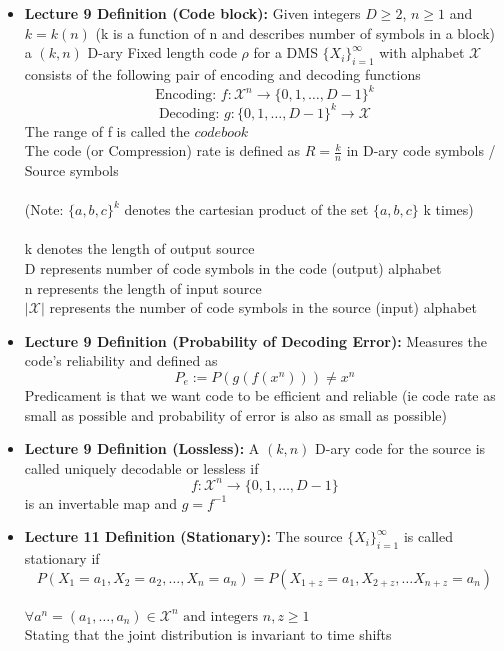 \documentclass{article}
\begin{document}
\begin{itemize}
    \item \textbf{Lecture 9 Definition (Code block):} Given integers \(D \geq 2\), \(n \geq 1\) and \(k = k(n)\) (k is a function of n and describes number of symbols in a block)  a \((k,n)\) D-ary Fixed length code \(\rho\) for a DMS \(\{X_{i}\}^\infty_{i=1}\) with alphabet \(\mathcal{X}\) consists of the following pair of encoding and decoding functions
    \[\text{Encoding: } f: \mathcal{X}^n \to \{0, 1, \ldots, D-1\}^k\] 
    \[\text{Decoding: } g: \{0, 1, \ldots, D-1\}^k \to \mathcal{X}\]
    The range of f is called the \(\mathit{codebook}\)
    \\ The code (or Compression) rate is defined as \(R = \frac{k}{n}\) in D-ary code symbols / Source symbols 
   \\
    \\(Note: \(\{a,b,c\}^k\) denotes the cartesian product of the set \(\{a,b,c\}\) k times)
    \\
   \\ k denotes the length of output source
   \\ D represents number of code symbols in the code (output) alphabet
   \\ n represents the length of input source
   \\ \(|\mathcal{X}|\) represents the number of code symbols in the source (input) alphabet
   
    \item \textbf{Lecture 9 Definition (Probability of Decoding Error): } Measures the code's reliability and defined as
   \[P_e := P(g(f(x^n))) \neq x^n\]
   Predicament is that we want code to be efficient and reliable (ie code rate as small as possible and probability of error is also as small as possible)
   
   \item \textbf{Lecture 9 Definition (Lossless):} A \((k,n)\) D-ary code for the source is called uniquely decodable or lessless if
    \[f: \mathcal{X}^n \to \{0,1,\ldots, D-1\}\]
    is an invertable map and \(g = f^{-1}\)
    \item \textbf{Lecture 11 Definition (Stationary): } The source \(\{X_i\}^\infty_{i=1}\) is called stationary if
    \[P(X_1=a_1, X_2 = a_2, \ldots, X_n = a_n) = P(X_{1+z} = a_1, X_{2+z}, \ldots X_{n+z} = a_n)\]
    \\ \(\forall a^n = (a_1, \ldots, a_n) \in \mathcal{X}^n \text{ and integers } n, z \geq 1\)
    \\ Stating that the joint distribution is invariant to time shifts
\end{itemize}
\end{document}
